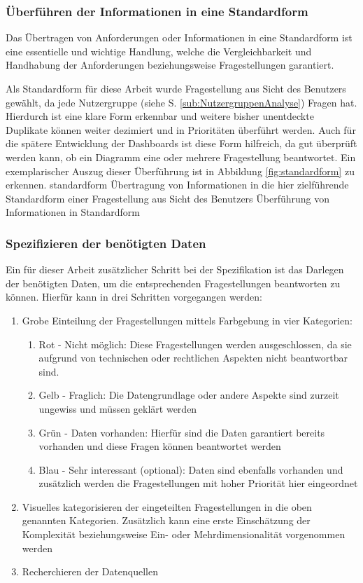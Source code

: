 \subsubsection{Überführen der Informationen in eine Standardform}
\label{subsub:standardform}
Das Übertragen von Anforderungen oder Informationen in eine Standardform ist eine essentielle und wichtige Handlung, welche die Vergleichbarkeit und Handhabung der Anforderungen beziehungsweise Fragestellungen garantiert.

Als Standardform für diese Arbeit wurde \glqq Fragestellung aus Sicht des Benutzers\grqq{} gewählt, da jede Nutzergruppe (siehe S.\pageref{sub:NutzergruppenAnalyse} \ref{sub:NutzergruppenAnalyse}) Fragen hat.
Hierdurch ist eine klare Form erkennbar und weitere bisher unentdeckte Duplikate können weiter dezimiert und in Prioritäten überführt werden.
Auch für die spätere Entwicklung der Dashboards ist diese Form hilfreich, da gut überprüft werden kann, ob ein Diagramm eine oder mehrere Fragestellung beantwortet.
Ein exemplarischer Auszug dieser Überführung ist in Abbildung \ref{fig:standardform} zu erkennen.
\bildbreit
{standardform}
{Übertragung von Informationen in die hier zielführende Standardform einer Fragestellung aus Sicht des Benutzers}
{Überführung von Informationen in Standardform}

\subsubsection{Spezifizieren der benötigten Daten}
\label{subsub:datenspez}
Ein für dieser Arbeit zusätzlicher Schritt bei der Spezifikation ist das Darlegen der benötigten Daten, um die entsprechenden Fragestellungen beantworten zu können.
Hierfür kann in drei Schritten vorgegangen werden:

\begin{enumerate}
\item \label{enum:grob} Grobe Einteilung der Fragestellungen mittels Farbgebung in vier Kategorien: %
	\begin{enumerate}
	\item Rot - Nicht möglich: Diese Fragestellungen werden ausgeschlossen, da sie aufgrund von technischen oder rechtlichen Aspekten nicht beantwortbar sind.
	\item Gelb - Fraglich: Die Datengrundlage oder andere Aspekte sind zurzeit ungewiss und müssen geklärt werden
	\item Grün - Daten vorhanden: Hierfür sind die Daten garantiert bereits vorhanden und diese Fragen können beantwortet werden
	\item Blau - Sehr interessant (optional): Daten sind ebenfalls vorhanden und zusätzlich werden die Fragestellungen mit hoher Priorität hier eingeordnet
	\end{enumerate}
\item Visuelles kategorisieren der eingeteilten Fragestellungen in die oben genannten Kategorien. 
Zusätzlich kann eine erste Einschätzung der Komplexität beziehungsweise Ein- oder Mehrdimensionalität vorgenommen werden
\item Recherchieren der Datenquellen
\end{enumerate}

